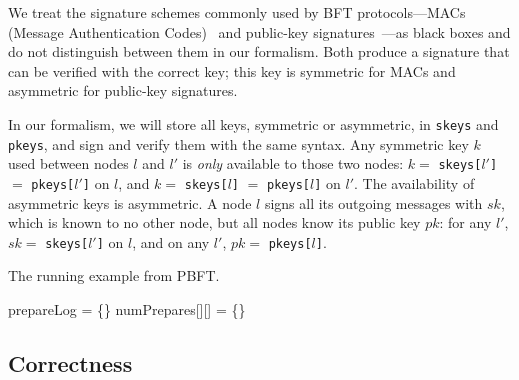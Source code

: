 We treat the signature schemes commonly used by BFT protocols---MACs (Message Authentication Codes)~\cite{MAC} and public-key signatures~\cite{signature}---as black boxes and do not distinguish between them in our formalism.
Both produce a signature that can be verified with the correct key; this key is symmetric for MACs and asymmetric for public-key signatures.

In our formalism, we will store all keys, symmetric or asymmetric, in \texttt{skeys} and \texttt{pkeys}, and sign and verify them with the same syntax.
Any symmetric key $k$ used between nodes $l$ and $l'$ is \emph{only} available to those two nodes: $k=$ \texttt{skeys[$l'$]} $=$ \texttt{pkeys[$l'$]} on $l$, and $k=$ \texttt{skeys[$l$]} $=$ \texttt{pkeys[$l$]} on $l'$.
The availability of asymmetric keys is asymmetric.
A node $l$ signs all its outgoing messages with $sk$, which is known to no other node, but all nodes know its public key $pk$: for any $l'$, $sk=$ \texttt{skeys[$l'$]} on $l$, and on any $l'$, $pk=$ \texttt{pkeys[$l$]}.


\begin{algorithm}
\caption{The running example from PBFT.}
\label{alg:running-example}
prepareLog = \{\}\;
numPrepares[][] = \{\}\;

\end{algorithm}



\subsection{Correctness}
\label{sec:correctness}

